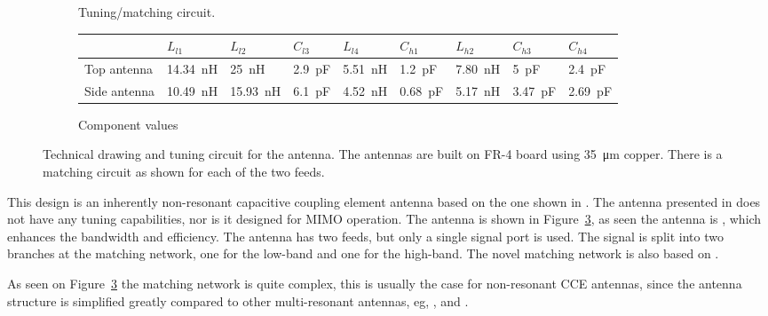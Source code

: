 \begin{figure}[htbp]
\begin{subfigure}[b]{0.49\linewidth}
        \caption{Tuning/matching circuit.}
        \label{fig:ant3schematic}
    \end{subfigure}
    \par\bigskip
        \begin{subfigure}[b]{\linewidth}
        \centering
        \footnotesize
        \begin{tabular}{|l|l|l|l|l|l|l|l|l|}
            \hline
                         & $L_{l1}$       & $L_{l2}$        & $C_{l3}$      & $L_{l4}$       & $C_{h1}$       & $L_{h2}$      & $C_{h3}$      & $C_{h4}$    \\
            \hline
            Top antenna  & \SI{14,34}{nH}  & \SI{25}{nH}  & \SI{2,9}{pF} & \SI{5,51}{nH} & \SI{1,2}{pF} & \SI{7,80}{nH} & \SI{5}{pF} & \SI{2.4}{pF} \\
            Side antenna & \SI{10,49}{nH}  & \SI{15,93}{nH}  & \SI{6.1}{pF} & \SI{4.52}{nH} & \SI{0.68}{pF} & \SI{5.17}{nH} & \SI{3.47}{pF} & \SI{2.69}{pF} \\
            \hline
        \end{tabular}
        \caption{Component values}
        \label{fig:ant3schematic}
    \end{subfigure}
    \caption{Technical drawing and tuning circuit for the antenna.  The antennas are built on FR-4 board using \SI{35}{\micro\meter} copper. There is a matching circuit as shown for each of the two feeds.}
    \label{fig:ant3techschem}
\end{figure}


This design is an inherently non-resonant capacitive coupling element antenna based on the one shown in \cite{valkonen2013inherently}. The antenna presented in \cite{valkonen2013inherently} does not have any tuning capabilities, nor is it designed for MIMO operation. The antenna is shown in Figure~\ref{fig:ant3techschem}, as seen the antenna is , which enhances the bandwidth and efficiency. The antenna has two feeds, but only a single signal port is used. The signal is split into two branches at the matching network, one for the low-band and one for the high-band. The novel matching network is also based on \cite{valkonen2013inherently}.

As seen on Figure~\ref{fig:ant3techschem} the matching network is quite complex, this is usually the case for non-resonant CCE antennas, since the antenna structure is simplified greatly compared to other multi-resonant antennas, eg, \cite{Tatomirescu2014AT}, \cite{Zhekov2015} and \cite{Zhang2013Diag}.

